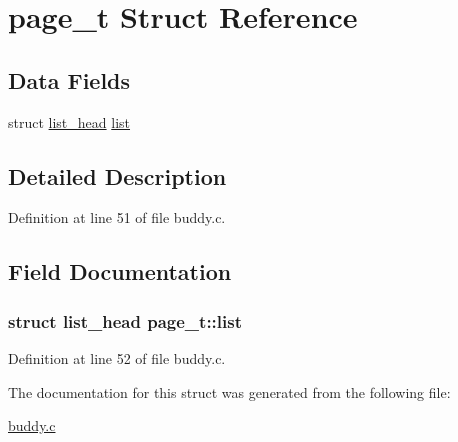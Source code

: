 \hypertarget{structpage__t}{\section{page\-\_\-t Struct Reference}
\label{structpage__t}
}
\subsection*{Data Fields}
\begin{DoxyCompactItemize}
\item 
struct \hyperlink{structlist__head}{list\-\_\-head} \hyperlink{structpage__t_a97306c6fff4f6280e8e8049412091475}{list}
\end{DoxyCompactItemize}


\subsection{Detailed Description}


Definition at line 51 of file buddy.\-c.



\subsection{Field Documentation}
\hypertarget{structpage__t_a97306c6fff4f6280e8e8049412091475}{
\subsubsection[{list}]{\setlength{\rightskip}{0pt plus 5cm}struct {\bf list\-\_\-head} page\-\_\-t\-::list}}\label{structpage__t_a97306c6fff4f6280e8e8049412091475}


Definition at line 52 of file buddy.\-c.



The documentation for this struct was generated from the following file\-:\begin{DoxyCompactItemize}
\item 
\hyperlink{buddy_8c}{buddy.\-c}\end{DoxyCompactItemize}

